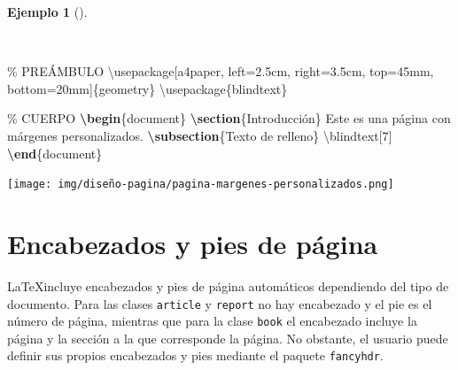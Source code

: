 \documentclass[
  a4paper,
]{scrreport}
\newenvironment{Shaded}{\begin{snugshade}}{\end{snugshade}}
\newcommand{\BuiltInTok}[1]{\textcolor[rgb]{0.00,0.23,0.31}{#1}}
\newcommand{\CommentTok}[1]{\textcolor[rgb]{0.37,0.37,0.37}{#1}}
\newcommand{\ExtensionTok}[1]{\textcolor[rgb]{0.00,0.23,0.31}{#1}}
\newcommand{\FunctionTok}[1]{\textcolor[rgb]{0.28,0.35,0.67}{#1}}
\newcommand{\KeywordTok}[1]{\textcolor[rgb]{0.00,0.23,0.31}{\textbf{#1}}}
\newcommand{\NormalTok}[1]{\textcolor[rgb]{0.00,0.23,0.31}{#1}}
\theoremstyle{definition}
\newtheorem{example}{Ejemplo}[chapter]
\theoremstyle{remark}
\begin{document}
\begin{example}[]\protect\hypertarget{exm-margenes}{}\label{exm-margenes}

~

\begin{Shaded}
\begin{Highlighting}[]
\CommentTok{\% PREÁMBULO}
\BuiltInTok{\textbackslash{}usepackage}\NormalTok{[a4paper, left=2.5cm, right=3.5cm, top=45mm, bottom=20mm]\{}\ExtensionTok{geometry}\NormalTok{\}}
\BuiltInTok{\textbackslash{}usepackage}\NormalTok{\{}\ExtensionTok{blindtext}\NormalTok{\}}

\CommentTok{\% CUERPO}
\KeywordTok{\textbackslash{}begin}\NormalTok{\{}\ExtensionTok{document}\NormalTok{\}}
\KeywordTok{\textbackslash{}section}\NormalTok{\{Introducción\}}
\NormalTok{Este es una página con márgenes personalizados.}
\KeywordTok{\textbackslash{}subsection}\NormalTok{\{Texto de relleno\}}
\FunctionTok{\textbackslash{}blindtext}\NormalTok{[7]}
\KeywordTok{\textbackslash{}end}\NormalTok{\{}\ExtensionTok{document}\NormalTok{\}}
\end{Highlighting}
\end{Shaded}

\begin{tcolorbox}[enhanced jigsaw, colframe=quarto-callout-note-color-frame, opacityback=0, title={Salida}, bottomrule=.15mm, left=2mm, coltitle=black, arc=.35mm, leftrule=.75mm, colback=white, rightrule=.15mm, colbacktitle=quarto-callout-note-color!10!white, toprule=.15mm, breakable, opacitybacktitle=0.6, bottomtitle=1mm, toptitle=1mm, titlerule=0mm]

\texttt{[image: img/diseño-pagina/pagina-margenes-personalizados.png]}

\end{tcolorbox}

\end{example}

\section{Encabezados y pies de
página}\label{encabezados-y-pies-de-puxe1gina}

\LaTeX incluye encabezados y pies de página automáticos dependiendo del
tipo de documento. Para las clases \texttt{article} y \texttt{report} no
hay encabezado y el pie es el número de página, mientras que para la
clase \texttt{book} el encabezado incluye la página y la sección a la
que corresponde la página. No obstante, el usuario puede definir sus
propios encabezados y pies mediante el paquete \texttt{fancyhdr}.
\end{document}
